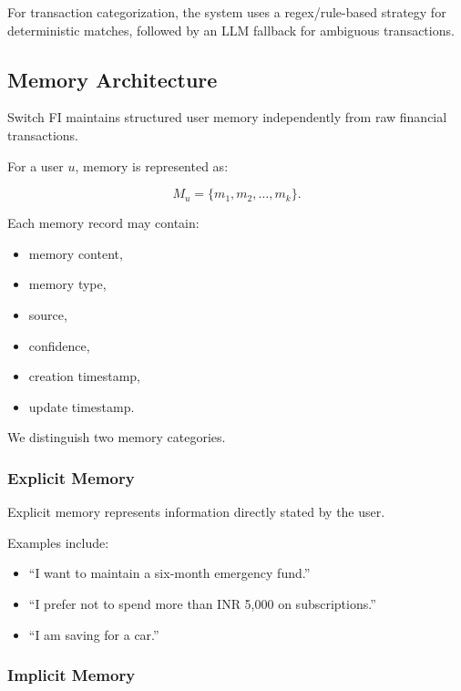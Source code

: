 \documentclass[conference]{IEEEtran}
\begin{document}
    For transaction categorization, the system uses a regex/rule-based
    strategy for deterministic matches, followed by an LLM fallback for
    ambiguous transactions.
    
    \subsection{Memory Architecture}
    
    Switch FI maintains structured user memory independently from raw
    financial transactions.
    
    For a user $u$, memory is represented as:
    
    \begin{equation}
    M_u = \{m_1,m_2,\ldots,m_k\}.
    \end{equation}
    
    Each memory record may contain:
    
    \begin{itemize}
        \item memory content,
        \item memory type,
        \item source,
        \item confidence,
        \item creation timestamp,
        \item update timestamp.
    \end{itemize}
    
    We distinguish two memory categories.
    
    \subsubsection{Explicit Memory}
    
    Explicit memory represents information directly stated by the user.
    
    Examples include:
    
    \begin{itemize}
        \item ``I want to maintain a six-month emergency fund.''
        \item ``I prefer not to spend more than INR 5,000 on subscriptions.''
        \item ``I am saving for a car.''
    \end{itemize}
    
    \subsubsection{Implicit Memory}
    
\end{document}
